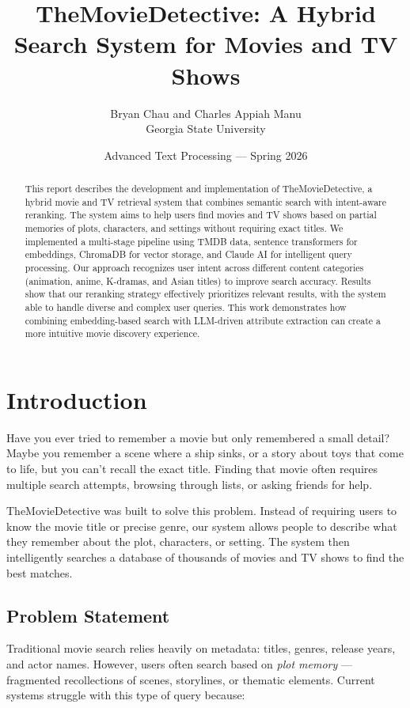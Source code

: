 \documentclass[11pt,a4paper]{article}
\title{\textbf{TheMovieDetective: A Hybrid Search System for Movies and TV Shows}}
\author{Bryan Chau and Charles Appiah Manu \\ Georgia State University}
\date{Advanced Text Processing --- Spring 2026}
\begin{document}
\maketitle

\begin{abstract}
This report describes the development and implementation of TheMovieDetective, a hybrid movie and TV retrieval system that combines semantic search with intent-aware reranking. The system aims to help users find movies and TV shows based on partial memories of plots, characters, and settings without requiring exact titles. We implemented a multi-stage pipeline using TMDB data, sentence transformers for embeddings, ChromaDB for vector storage, and Claude AI for intelligent query processing. Our approach recognizes user intent across different content categories (animation, anime, K-dramas, and Asian titles) to improve search accuracy. Results show that our reranking strategy effectively prioritizes relevant results, with the system able to handle diverse and complex user queries. This work demonstrates how combining embedding-based search with LLM-driven attribute extraction can create a more intuitive movie discovery experience.
\end{abstract}

\section{Introduction}

Have you ever tried to remember a movie but only remembered a small detail? Maybe you remember a scene where a ship sinks, or a story about toys that come to life, but you can't recall the exact title. Finding that movie often requires multiple search attempts, browsing through lists, or asking friends for help. 

TheMovieDetective was built to solve this problem. Instead of requiring users to know the movie title or precise genre, our system allows people to describe what they remember about the plot, characters, or setting. The system then intelligently searches a database of thousands of movies and TV shows to find the best matches.

\subsection{Problem Statement}

Traditional movie search relies heavily on metadata: titles, genres, release years, and actor names. However, users often search based on \textit{plot memory} --- fragmented recollections of scenes, storylines, or thematic elements. Current systems struggle with this type of query because:
\end{document}
